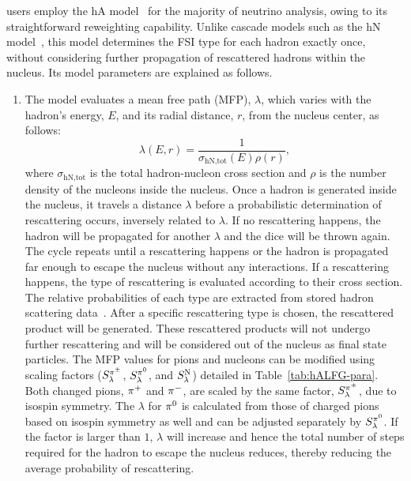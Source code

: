 \genie users employ the hA model~\cite{Andreopoulos:2015wxa} for the majority of neutrino analysis, owing to its straightforward reweighting capability. 
Unlike cascade models such as the hN model~\cite{Andreopoulos:2015wxa}, this model determines the FSI type for each hadron exactly once, without considering further propagation of rescattered hadrons within the nucleus. 
Its model parameters are explained as follows.

\begin{enumerate}
    \item 
    The model evaluates a mean free path (MFP), $\lambda$, which varies with the hadron's energy, $E$, and its radial distance, $r$, from the nucleus center,  as follows:
    \begin{equation}
        \lambda(E,r) = \frac{1}{\sigma_\textrm{hN,tot}(E)\rho(r)},
    \end{equation}
    where $\sigma_\textrm{hN,tot}$ is the total hadron-nucleon cross section and $\rho$ is the number density of the nucleons inside the nucleus. Once a hadron is generated inside the nucleus, it travels a distance $\lambda$ before a probabilistic determination of rescattering occurs, inversely related to  $\lambda$. If no rescattering happens, the hadron will be propagated for another $\lambda$ and the dice will be thrown again. The cycle repeats until a rescattering happens or the hadron is propagated far enough to escape the nucleus without any interactions. If a rescattering happens, the type of rescattering is evaluated according to their cross section. The relative probabilities of each type are extracted from stored hadron scattering data~\cite{LADS:1999dyv,Navon:1983xj,Carroll:1976hj,Clough:1974qt,BAUHOFF1986429,Mashnik:2000up,Ishibashi:1997gbe}. After a specific rescattering type is chosen, the rescattered product will be generated. These rescattered products will not undergo further rescattering and will be considered out of the nucleus as final state particles.  
    The MFP values for pions and nucleons can be modified using scaling factors  ($S_\lambda^{\pi^{\pm}}$, $S_\lambda^{\pi^{0}}$,  and $S_\lambda^\textrm{N}$) detailed in Table~\ref{tab:hALFG-para}. Both changed pions, $\pi^+$ and $\pi^-$, are scaled by the same factor, $S_\lambda^{\pi^{\pm}}$, due to isospin symmetry. The $\lambda$ for $\pi^0$ is calculated from those of charged pions based on isospin symmetry as well and can be adjusted separately by $S_\lambda^{\pi^{0}}$. If the factor is larger than $1$, $\lambda$ will increase and hence the total number of steps required for the hadron to escape the nucleus reduces, thereby reducing the average probability of rescattering. 

\end{enumerate}
